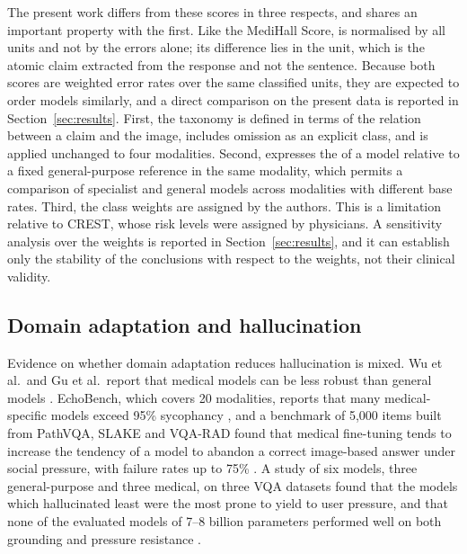 The present work differs from these scores in three respects, and shares an important property with the first. Like the MediHall Score, \SMHR{} is normalised by all units and not by the errors alone; its difference lies in the unit, which is the atomic claim extracted from the response and not the sentence. Because both scores are weighted error rates over the same classified units, they are expected to order models similarly, and a direct comparison on the present data is reported in Section~\ref{sec:results}. First, the taxonomy is defined in terms of the relation between a claim and the image, includes omission as an explicit class, and is applied unchanged to four modalities. Second, \SRI{} expresses the \SMHR{} of a model relative to a fixed general-purpose reference in the same modality, which permits a comparison of specialist and general models across modalities with different base rates. Third, the class weights are assigned by the authors. This is a limitation relative to CREST, whose risk levels were assigned by physicians. A sensitivity analysis over the weights is reported in Section~\ref{sec:results}, and it can establish only the stability of the conclusions with respect to the weights, not their clinical validity.

\subsection{Domain adaptation and hallucination}
\label{subsec:rw_special}

Evidence on whether domain adaptation reduces hallucination is mixed. Wu et al.\ and Gu et al.\ report that medical models can be less robust than general models \citep{wu2024halluvqa,gu2024medvh}. EchoBench, which covers 20 modalities, reports that many medical-specific models exceed 95\% sycophancy \citep{yuan2025echobench}, and a benchmark of 5,000 items built from PathVQA, SLAKE and VQA-RAD found that medical fine-tuning tends to increase the tendency of a model to abandon a correct image-based answer under social pressure, with failure rates up to 75\% \citep{xu2025sycophancy}. A study of six models, three general-purpose and three medical, on three VQA datasets found that the models which hallucinated least were the most prone to yield to user pressure, and that none of the evaluated models of 7--8 billion parameters performed well on both grounding and pressure resistance \citep{aranya2026grounding}.

